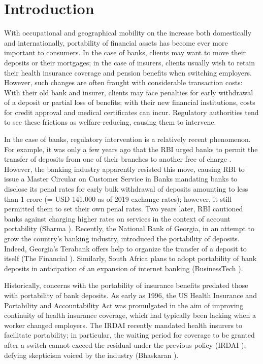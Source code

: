 \section{Introduction}
\label{sec:intro}

With occupational and geographical mobility on the increase both domestically and internationally, portability of financial assets has become ever more important to consumers. In the case of banks, clients may want to move their deposits or their mortgages; in the case of insurers, clients usually wish to retain their health insurance coverage and pension benefits when switching employers. However, such changes are often fraught with considerable transaction costs: With their old bank and insurer, clients may face penalties for early withdrawal of a deposit or partial loss of benefits; with their new financial institutions, costs for credit approval and medical certificates can incur. Regulatory authorities tend to see these frictions as welfare-reducing, causing them to intervene.


In the case of banks, regulatory intervention is a relatively recent phenomenon. For example, it was only a few years ago that the \ac{RBI} urged banks to permit the transfer of deposits from one of their branches to another free of charge \cite{PTI2012RBIPortability}. However, the banking industry apparently resisted this move, causing \ac{RBI} \cite{ReserveBankofIndia2015MasterBanks} to issue a Master Circular on Customer Service in Banks mandating banks to disclose its penal rates for early bulk withdrawal of deposits amounting to less than 1 crore (= USD 141,000 as of 2019 exchange rates); however, it still permitted them to set their own penal rates. Two years later, \ac{RBI} cautioned banks against charging higher rates on services in the context of account portability (Sharma \cite{Sharma2017RBITimes}). Recently, the National Bank of Georgia, in an attempt to grow the country's banking industry, introduced the portability of deposits. Indeed, Georgia's Terabank offers help to organize the transfer of a deposit to itself (The Financial \cite{TheFinancial2018TerabankTerabank}). Similarly, South Africa plans to adopt portability of bank deposits in anticipation of an expansion of internet banking (BusinessTech \cite{BusinessTech2018SouthReport}).


Historically, concerns with the portability of insurance benefits predated those with portability of bank deposits. As early as 1996, the US Health Insurance and Portability and Accountability Act was promulgated in the aim of improving continuity of health insurance coverage, which had typically been lacking when a worker changed employers. The \ac{IRDAI} recently mandated health insurers to facilitate portability; in particular, the waiting period for coverage to be granted after a switch cannot exceed the residual under the previous policy (\ac{IRDAI} \cite{IRDAI2020GuidelinesPolicies}), defying skepticism voiced by the industry (Bhaskaran \cite{Bhaskaran2017WillWork}).


